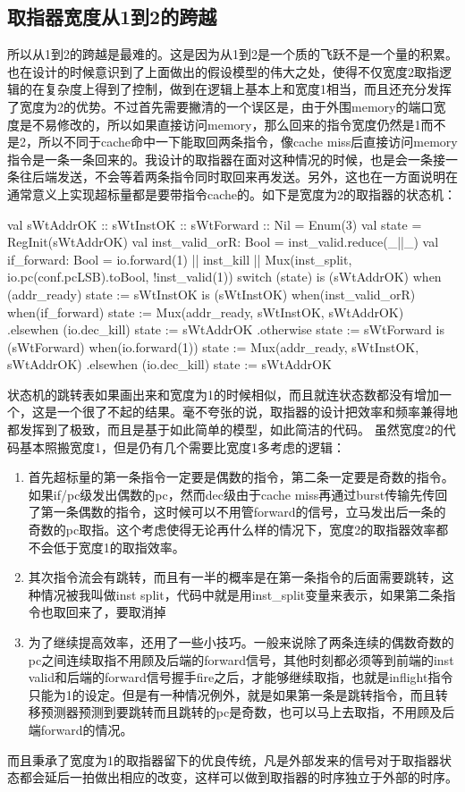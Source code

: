 \documentclass[11pt]{article}
\begin{document}
\subsection{取指器宽度从1到2的跨越}
所以从1到2的跨越是最难的。这是因为从1到2是一个质的飞跃不是一个量的积累。也在设计的时候意识到了上面做出的假设模型的伟大之处，使得不仅宽度2取指逻辑的在复杂度上得到了控制，做到在逻辑上基本上和宽度1相当，而且还充分发挥了宽度为2的优势。不过首先需要撇清的一个误区是，由于外围memory的端口宽度是不易修改的，所以如果直接访问memory，那么回来的指令宽度仍然是1而不是2，所以不同于cache命中一下能取回两条指令，像cache miss后直接访问memory指令是一条一条回来的。我设计的取指器在面对这种情况的时候，也是会一条接一条往后端发送，不会等着两条指令同时取回来再发送。另外，这也在一方面说明在通常意义上实现超标量都是要带指令cache的。如下是宽度为2的取指器的状态机：
\begin{scala}
	val sWtAddrOK :: sWtInstOK :: sWtForward :: Nil = Enum(3)
	val state = RegInit(sWtAddrOK)
	val inst_valid_orR: Bool = inst_valid.reduce(_||_)
	val if_forward: Bool = io.forward(1) || inst_kill || Mux(inst_split, io.pc(conf.pcLSB).toBool, !inst_valid(1))
	switch (state) {
		is (sWtAddrOK) {
			when (addr_ready) { state := sWtInstOK }
		}
		is (sWtInstOK) {
			when(inst_valid_orR) {
				when(if_forward) {
					state := Mux(addr_ready, sWtInstOK, sWtAddrOK)
				}.elsewhen (io.dec_kill) { state := sWtAddrOK
				}.otherwise { state := sWtForward }
			}
		}
		is (sWtForward) {
			when(io.forward(1)) {
				state := Mux(addr_ready, sWtInstOK, sWtAddrOK)
			}.elsewhen (io.dec_kill) { state := sWtAddrOK }
		}
	}
\end{scala}
状态机的跳转表如果画出来和宽度为1的时候相似，而且就连状态数都没有增加一个，这是一个很了不起的结果。毫不夸张的说，取指器的设计把效率和频率兼得地都发挥到了极致，而且是基于如此简单的模型，如此简洁的代码。
虽然宽度2的代码基本照搬宽度1，但是仍有几个需要比宽度1多考虑的逻辑：
\begin{enumerate}
	\item 首先超标量的第一条指令一定要是偶数的指令，第二条一定要是奇数的指令。如果if/pc级发出偶数的pc，然而dec级由于cache miss再通过burst传输先传回了第一条偶数的指令，这时候可以不用管forward的信号，立马发出后一条的奇数的pc取指。这个考虑使得无论再什么样的情况下，宽度2的取指器效率都不会低于宽度1的取指效率。
	\item 其次指令流会有跳转，而且有一半的概率是在第一条指令的后面需要跳转，这种情况被我叫做inst split，代码中就是用inst\_split变量来表示，如果第二条指令也取回来了，要取消掉
	\item 为了继续提高效率，还用了一些小技巧。一般来说除了两条连续的偶数奇数的pc之间连续取指不用顾及后端的forward信号，其他时刻都必须等到前端的inst valid和后端的forward信号握手fire之后，才能够继续取指，也就是inflight指令只能为1的设定。但是有一种情况例外，就是如果第一条是跳转指令，而且转移预测器预测到要跳转而且跳转的pc是奇数，也可以马上去取指，不用顾及后端forward的情况。
\end{enumerate}
而且秉承了宽度为1的取指器留下的优良传统，凡是外部发来的信号对于取指器状态都会延后一拍做出相应的改变，这样可以做到取指器的时序独立于外部的时序。
\end{document}
